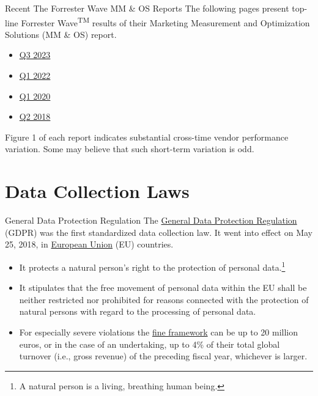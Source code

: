 \documentclass[pdf]{beamer}
\theoremstyle{remark}
\theoremstyle{definition}
\begin{document}
\begin{frame}[t]{Recent The Forrester Wave MM \& OS Reports}
The following pages present top-line Forrester Wave\textsuperscript{TM} results of their Marketing Measurement and Optimization Solutions (MM \& OS) report.
\begin{itemize}
  \item \href{https://www.forrester.com/report/the-forrester-wave-tm-marketing-measurement-and-optimization-q3-2023/RES178517?ref_search=3539799_1693518171857}{Q3 2023} 
  \item \href{https://www.forrester.com/report/the-forrester-wave-tm-marketing-measurement-and-optimization-solutions-q1-2022/RES176312?ref_search=2100840_1643667194789}{Q1 2022}
  \item \href{https://f.hubspotusercontent00.net/hubfs/1878504/Forrester\%20Wave\%20Report\%202020/The_Forrester_Wave_Marketing\%20Measurement\%20And\%20Optimization\%20Solutions,\%20Q1\%202020.pdf?utm_campaign=Forrester\%20Wave\%20Report\%202020&utm_source=Content\%20Library}{Q1 2020}
  \item \href{https://cdn2.hubspot.net/hubfs/1878504/Forrester\%20Wave\%20Q2\%202018.pdf}{Q2 2018}
\end{itemize}
\vspace{1.5ex}
Figure 1 of each report indicates substantial cross-time vendor performance variation.  Some may believe that such short-term variation is odd. 
\end{frame}

\section{Data Collection Laws}

\begin{frame}[t]{General Data Protection Regulation}
The \href{https://gdpr-info.eu/}{General Data Protection Regulation} 
(GDPR) was the first standardized data collection law. It went into effect on May 25, 2018, in \href{https://european-union.europa.eu/principles-countries-history/country-profiles_en}{European Union} (EU) countries. \\
\vspace{1.5ex}
\begin{itemize}
  \item It protects a natural person's right to the protection of personal data.\footnote{A natural person is a living, breathing human being.}
  \item It stipulates that the free movement of personal data within the EU shall be neither restricted nor prohibited for reasons connected with the protection of natural persons with regard to the processing of personal data.
  \item  For especially severe violations the 
  \href{https://gdpr-info.eu/issues/fines-penalties/\#:~:text=83(4)\%20GDPR\%20sets\%20forth,to\%20that\%20used\%20in\%20Art}{fine framework} 
  can be up to 20 million euros, or in the case of an undertaking, up to 4\% of their total global turnover (i.e., gross revenue) of the preceding fiscal year, whichever is larger.
\end{itemize}
\end{frame}
\end{document}
